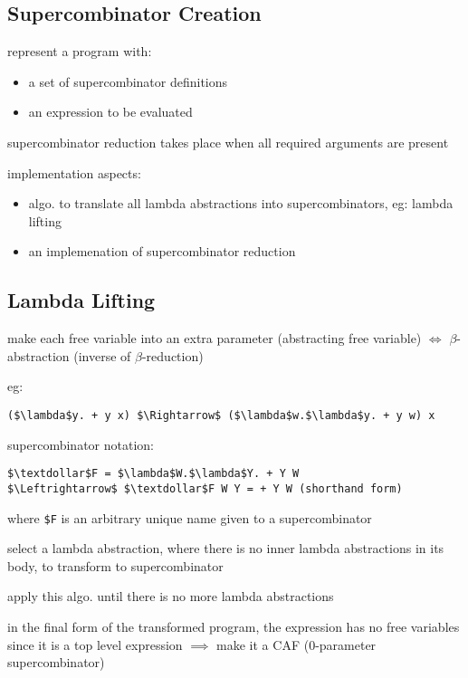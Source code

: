 \documentclass[8pt]{extarticle}
\begin{document}
\begin{multicols*}{2}
\begin{tblr}[]{}
\subsection{Supercombinator Creation}

represent a program with:
\begin{itemize}
\item a set of supercombinator definitions
\item an expression to be evaluated
\end{itemize}

supercombinator reduction takes place when all required arguments are present

implementation aspects:
\begin{itemize}
\item algo. to translate all lambda abstractions into supercombinators, eg: lambda lifting
\item an implemenation of supercombinator reduction
\end{itemize}

\subsection{Lambda Lifting}

make each free variable into an extra parameter (abstracting free variable) $\iff$ $\beta$-abstraction (inverse of $\beta$-reduction)

eg:

\begin{lstlisting}
($\lambda$y. + y x) $\Rightarrow$ ($\lambda$w.$\lambda$y. + y w) x
\end{lstlisting}

supercombinator notation:
\begin{lstlisting}
$\textdollar$F = $\lambda$W.$\lambda$Y. + Y W
$\Leftrightarrow$ $\textdollar$F W Y = + Y W (shorthand form)
\end{lstlisting}
where \verb|$F| is an arbitrary unique name given to a supercombinator

select a lambda abstraction, where there is no inner lambda abstractions in its body, to transform to supercombinator

apply this algo. until there is no more lambda abstractions

in the final form of the transformed program, the expression has no free variables since it is a top level expression $\implies$ make it a CAF (0-parameter supercombinator)


\end{tblr}
\end{multicols*}
\end{document}
